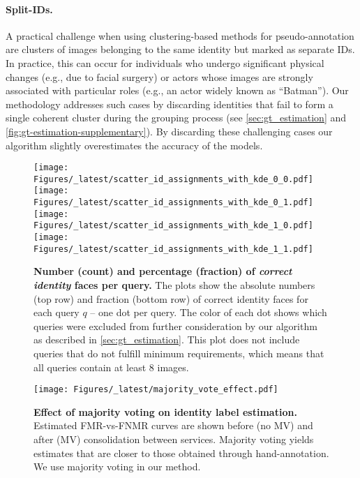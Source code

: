 \documentclass[10pt,twocolumn,letterpaper]{article}
\begin{document}
\begin{appendices}
\paragraph{Split-IDs.}
A practical challenge when using clustering-based methods for pseudo-annotation are clusters of images belonging to the same identity but marked as separate IDs. In practice, this can occur for individuals who undergo significant physical changes (e.g., due to facial surgery) or actors whose images are strongly associated with particular roles (e.g., an actor widely known as “Batman”). Our methodology addresses such cases by discarding identities that fail to form a single coherent cluster during the grouping process (see \cref{sec:gt_estimation} and \cref{fig:gt-estimation-supplementary}). By discarding these challenging cases our algorithm slightly overestimates the accuracy of the models.

\begin{figure}[ht!]
    \centering
    \texttt{[image: Figures/\_latest/scatter\_id\_assignments\_with\_kde\_0\_0.pdf]}
    \texttt{[image: Figures/\_latest/scatter\_id\_assignments\_with\_kde\_0\_1.pdf]}
    \texttt{[image: Figures/\_latest/scatter\_id\_assignments\_with\_kde\_1\_0.pdf]}
    \texttt{[image: Figures/\_latest/scatter\_id\_assignments\_with\_kde\_1\_1.pdf]}
    
    \caption{{\bf Number (count) and percentage (fraction) of \textit{correct identity} faces per query.} The plots show the absolute numbers (top row) and fraction (bottom row) of correct identity faces for each query $q$ -- one dot per query. The color of each dot shows which queries were excluded from further consideration by our algorithm as described in \cref{sec:gt_estimation}. This plot does not include queries that do not fulfill minimum requirements, which means that all queries contain at least 8 images.}
    \label{fig:correct-ID-scatter-plot}
\end{figure}


\begin{figure}[ht!]
    \centering
\texttt{[image: Figures/\_latest/majority\_vote\_effect.pdf]}
    \caption{{\bf Effect of majority voting on identity label estimation.} Estimated FMR-vs-FNMR curves are shown before (no MV) and after (MV) consolidation between services. Majority voting yields estimates that are closer to those obtained through hand-annotation. We use majority voting in our method.}
    \label{fig:majority-vote}
\end{figure}


\end{appendices}
\end{document}
